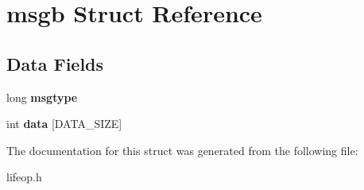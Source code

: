\hypertarget{structmsgb}{}\section{msgb Struct Reference}
\label{structmsgb}
\subsection*{Data Fields}
\begin{DoxyCompactItemize}
\item 
\hypertarget{structmsgb_ac484c31c03a19ecf6c602d2beb805267}{}long {\bfseries msgtype}\label{structmsgb_ac484c31c03a19ecf6c602d2beb805267}

\item 
\hypertarget{structmsgb_adcb32367e9da1068f2e7a266f9c16f20}{}int {\bfseries data} \mbox{[}D\+A\+T\+A\+\_\+\+S\+I\+Z\+E\mbox{]}\label{structmsgb_adcb32367e9da1068f2e7a266f9c16f20}

\end{DoxyCompactItemize}


The documentation for this struct was generated from the following file\+:\begin{DoxyCompactItemize}
\item 
lifeop.\+h\end{DoxyCompactItemize}
